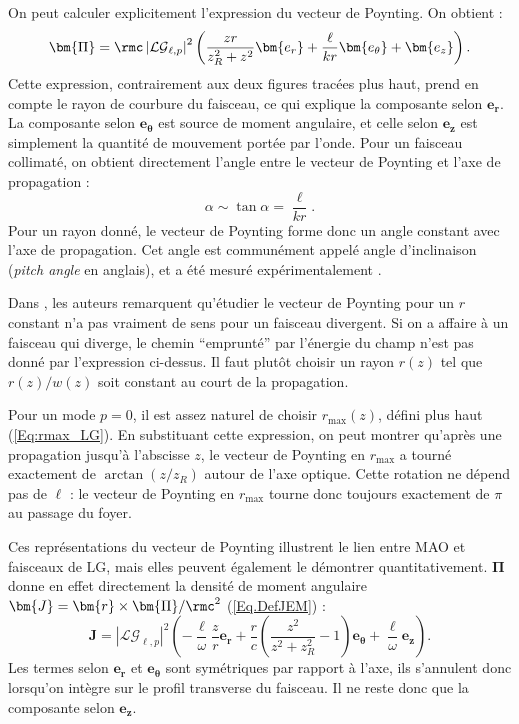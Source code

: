 On peut calculer explicitement l'expression du vecteur de Poynting. On obtient  :
\begin{equation*}
\bm{\Pi} = \rmc\left|\mathcal{LG}_{\ell,p}\right|^2\left(\frac{zr}{z_R^2+z^2}\bm{e_r}+\frac{\ell}{kr}\bm{e_\theta}+\bm{e_z}\right).
\end{equation*}
Cette expression, contrairement aux deux figures tracées plus haut, prend en compte le rayon de courbure du faisceau, ce qui explique la composante selon $\bm{e_r}$. La composante selon $\bm{e_\theta}$ est source de moment angulaire, et celle selon $\bm{e_z}$ est simplement la quantité de mouvement portée par l'onde. Pour un faisceau collimaté, on obtient directement l'angle entre le vecteur de Poynting et l'axe de propagation :
\begin{equation*}
\alpha \sim \tan{\alpha} = \frac{\ell}{kr}.
\end{equation*}
Pour un rayon donné, le vecteur de Poynting forme donc un angle constant avec l'axe de propagation. Cet angle est communément appelé angle d'inclinaison (\textit{pitch angle} en anglais), et a été mesuré expérimentalement .\par
Dans , les auteurs remarquent qu'étudier le vecteur de Poynting pour un $r$ constant n'a pas vraiment de sens pour un faisceau divergent. Si on a affaire à un faisceau qui diverge, le chemin ``emprunté'' par l'énergie du champ n'est pas donné par l'expression ci-dessus. Il faut plutôt choisir un rayon $r(z)$ tel que $r(z)/w(z)$ soit constant au court de la propagation.\par
Pour un mode $p=0$, il est assez naturel de choisir $r_\mathrm{max}(z)$, défini plus haut (\ref{Eq:rmax_LG}). En substituant cette expression, on peut montrer  qu'après une propagation jusqu'à l'abscisse $z$, le vecteur de Poynting en $r_\mathrm{max}$ a tourné exactement de $\arctan{(z/z_R)}$ autour de l'axe optique. Cette rotation ne dépend pas de $\ell$ : le vecteur de Poynting en $r_\mathrm{max}$ tourne donc toujours exactement de $\pi$ au passage du foyer. 

Ces représentations du vecteur de Poynting illustrent le lien entre MAO et faisceaux de LG, mais elles peuvent également le démontrer quantitativement. $\bm{\Pi}$ donne en effet directement la densité de moment angulaire $\bm{J} = \bm{r}\times\bm{\Pi}/\rmc^2$ (\ref{Eq.DefJEM}) :
\begin{equation*}
\bm{J} = \left|\mathcal{LG}_{\ell,p}\right|^2\left(-\frac{\ell}{\omega}\frac{z}{r}\bm{e_r}+\frac{r}{c}\left(\frac{z^2}{z^2+z_R^2} -1\right)\bm{e_\theta}+\frac{\ell}{\omega}\bm{e_z}\right).
\end{equation*}
Les termes selon $\bm{e_r}$ et $\bm{e_\theta}$ sont symétriques par rapport à l'axe, ils s'annulent donc lorsqu'on intègre sur le profil transverse du faisceau. Il ne reste donc que la composante selon $\bm{e_z}$. 

